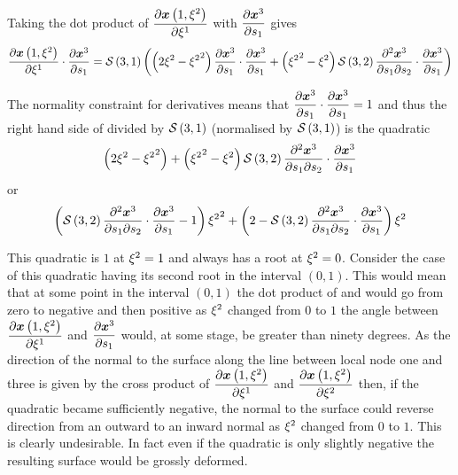 Taking the dot product of $\delby{\fnof{\vect{x}}{1,\xitwo}}{\xione}$ with 
$\delby{\nodept{\vect{x}}{3}}{s_{1}}$ gives
\begin{equation}
  \dotprod{\delby{\fnof{\vect{x}}{1,\xitwo}}{\xione}}{\delby{\nodept{\vect{x}}{3}}
    {s_{1}}} = \nsftwo{3}{1}
  \pbrac{\pbrac{2\xitwo-\xitwosq}\dotprod{\delby{\nodept{\vect{x}}{3}}{s_{1}}}
    {\delby{\nodept{\vect{x}}{3}}{s_{1}}}+\pbrac{\xitwosq-\xitwo}\nsftwo{3}{2}
    \dotprod{\deltwoby{\nodept{\vect{x}}{3}}{s_{1}}{s_{2}}}
    {\delby{\nodept{\vect{x}}{3}}{s_{1}}}}
  \label{eqn:hsonedirectiondotprod}
\end{equation}

The normality constraint for \arclen derivatives means that
$\dotprod{\delby{\nodept{\vect{x}}{3}}{s_{1}}}{\delby{\nodept{\vect{x}}{3}}
  {s_{1}}}=1$ and thus the right hand side of
 divided by $   \mathcal{S} \left( 3,1 \right)  $ (\ie normalised
by $   \mathcal{S} \left( 3,1 \right)  $) is the quadratic
\begin{equation*}
  \pbrac{2\xitwo-\xitwosq}+\pbrac{\xitwosq-\xitwo}\nsftwo{3}{2}
  \dotprod{\deltwoby{\nodept{\vect{x}}{3}}{s_{1}}{s_{2}}}{\delby{\nodept{\vect{x}}
      {3}}{s_{1}}} 
\end{equation*}
or
\begin{equation*}
  \pbrac{\nsftwo{3}{2}\dotprod{\deltwoby{\nodept{\vect{x}}{3}}{s_{1}}{s_{2}}}
    {\delby{\nodept{\vect{x}}{3}}{s_{1}}} -1}\xitwosq+
  \pbrac{2-\nsftwo{3}{2}\dotprod{\deltwoby{\nodept{\vect{x}}{3}}{s_{1}}{s_{2}}}
    {\delby{\nodept{\vect{x}}{3}}{s_{1}}}}\xitwo
  \label{eqn:hsonedirectionpolynomial}
\end{equation*}

This quadratic is $1$ at $\xi^{2}=1$ and always has a root at $\xi^{2}=0$.
Consider the case of this quadratic having its second root in the interval
$(0,1)$. This would mean that at some point in the interval $(0,1)$ the dot
product of  and
 would go from zero to negative and then
positive as $\xi^{2}$ changed from $0$ to $1$ \ie the angle between
$\delby{\fnof{\vect{x}}{1,\xitwo}}{\xione}$ and
$\delby{\nodept{\vect{x}}{3}}{s_{1}}$ would, at some stage, be greater than
ninety degrees. As the direction of the normal to the surface along the line
between local node one and three is given by the cross product of
$\delby{\fnof{\vect{x}}{1,\xitwo}}{\xione}$ and
$\delby{\fnof{\vect{x}}{1,\xitwo}}{\xitwo}$ then, if the quadratic became
sufficiently negative, the normal to the surface could reverse direction from
an outward to an inward normal as $\xi^{2}$ changed from $0$ to $1$. This is
clearly undesirable. In fact even if the quadratic is only slightly negative
the resulting surface would be grossly deformed.

